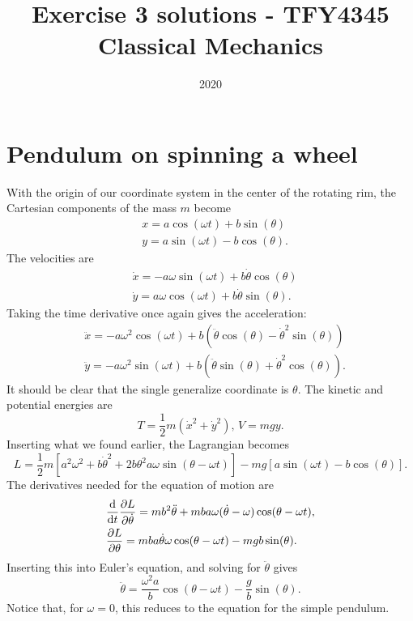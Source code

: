 \documentclass{article}
\title{Exercise 3 solutions - TFY4345 Classical Mechanics}
\date{2020}
\begin{document}
    \maketitle
    \section{Pendulum on spinning a wheel}
        With the origin of our coordinate system in the center of the rotating rim, the Cartesian components of the mass $m$ become
        \begin{align*}
            &x = a \cos(\omega t) + b \sin(\theta) \\
            &y = a \sin(\omega t) - b \cos(\theta).
        \end{align*}
        The velocities are
        \begin{align*}
            &\dot x = - a \omega \sin(\omega t) + b \dot \theta \cos(\theta) \\
            &\dot y = a \omega \cos(\omega t) + b \dot \theta \sin(\theta).
        \end{align*}
        Taking the time derivative once again gives the acceleration:
        \begin{align*}
            &\ddot x = -a \omega^2 \cos(\omega t) + b(\ddot \theta \cos(\theta) - \dot \theta^2 \sin(\theta)) \\
            &\ddot y = - a \omega^2 \sin(\omega t) + b(\ddot \theta \sin(\theta) + \dot \theta^2 \cos(\theta)).
        \end{align*}
        It should be clear that the single generalize coordinate is $\theta$. The kinetic and potential energies are 
        \begin{equation*}
            T = \frac{1}{2}m (\dot x^2 + \dot y^2), \, V = mgy.
        \end{equation*}
        Inserting what we found earlier, the Lagrangian becomes
        \begin{equation*}
            L = \frac{1}{2}m[a^2 \omega^2 + b \dot \theta^2 + 2 b \theta^2 a \omega \sin(\theta - \omega t)] - mg[a \sin(\omega t) - b \cos(\theta)].
        \end{equation*}
        The derivatives needed for the equation of motion are
        \begin{align*}
            &\dv{t}\pdv{L}{\dot \theta} = mb^2 \ddot \theta + m b a \omega (\dot \theta - \omega) \cos(\theta - \omega t), \\
            &\pdv{L}{\theta} = mba \dot \theta \omega \cos(\theta - \omega t) - m g b \sin(\theta).
        \end{align*}
        Inserting this into Euler's equation, and solving for $\ddot \theta$ gives
        \begin{equation*}
            \ddot \theta = \frac{\omega^2 a}{b}\cos(\theta-\omega t) - \frac{g}{b} \sin(\theta).
        \end{equation*}
        Notice that, for $\omega = 0$, this reduces to the equation for the simple pendulum.
\end{document}
